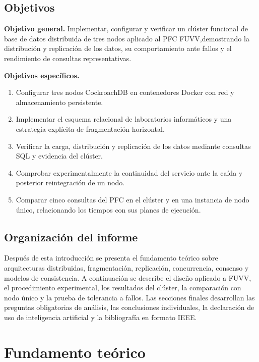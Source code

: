 \documentclass[12pt,a4paper]{article}
\begin{document}
\subsection{Objetivos}

\textbf{Objetivo general.} Implementar, configurar y verificar un clúster funcional de base de datos distribuida de tres nodos aplicado al PFC FUVV,demostrando la distribución y replicación de los datos, su comportamiento ante fallos y el rendimiento de consultas representativas.

\textbf{Objetivos específicos.} \begin{enumerate} \item Configurar tres nodos CockroachDB en contenedores Docker con red y almacenamiento persistente. \item Implementar el esquema relacional de laboratorios informáticos y una estrategia explícita de fragmentación horizontal. \item Verificar la carga, distribución y replicación de los datos mediante consultas SQL y evidencia del clúster. \item Comprobar experimentalmente la continuidad del servicio ante la caída y posterior reintegración de un nodo. \item Comparar cinco consultas del PFC en el clúster y en una instancia de nodo único, relacionando los tiempos con sus planes de ejecución. \end{enumerate}

\subsection{Organización del informe}

Después de esta introducción se presenta el fundamento teórico sobre arquitecturas distribuidas, fragmentación, replicación, concurrencia, consenso y modelos de consistencia. A continuación se describe el diseño aplicado a FUVV, el procedimiento experimental, los resultados del clúster, la comparación con nodo único y la prueba de tolerancia a fallos. Las secciones finales desarrollan las preguntas obligatorias de análisis, las conclusiones individuales, la declaración de uso de inteligencia artificial y la bibliografía en formato IEEE.

\section{Fundamento teórico}
\label{sec:fundamento-teorico}
\end{document}
